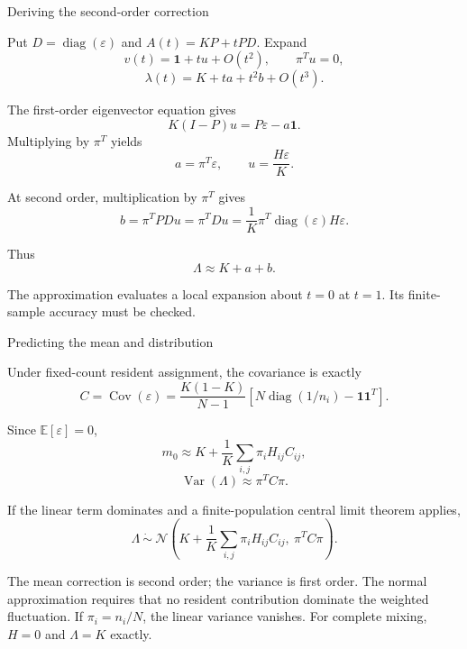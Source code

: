 \begin{frame}{Deriving the second-order correction}
\small

Put $D=\operatorname{diag}(\varepsilon)$ and
$A(t)=KP+tPD$. Expand
\[
    v(t)=\mathbf{1}+tu+O(t^2),
    \qquad
    \pi^Tu=0,
\]
\[
    \lambda(t)=K+ta+t^2b+O(t^3).
\]

The first-order eigenvector equation gives
\[
    K(I-P)u=P\varepsilon-a\mathbf{1}.
\]
Multiplying by $\pi^T$ yields
\[
    a=\pi^T\varepsilon,
    \qquad
    u=\frac{H\varepsilon}{K}.
\]

At second order, multiplication by $\pi^T$ gives
\[
    b=\pi^TPDu
     =\pi^TDu
     =\frac{1}{K}
       \pi^T\operatorname{diag}(\varepsilon)H\varepsilon.
\]

Thus
\[
    \Lambda\approx K+a+b.
\]

{\footnotesize
The approximation evaluates a local expansion about $t=0$
at $t=1$. Its finite-sample accuracy must be checked.
}
\end{frame}



\begin{frame}{Predicting the mean and distribution}
\small

Under fixed-count resident assignment, the covariance is exactly
\[
    C=\operatorname{Cov}(\varepsilon)
    =
    \frac{K(1-K)}{N-1}
    \left[
        N\operatorname{diag}(1/n_i)
        -\mathbf{1}\mathbf{1}^T
    \right].
\]

Since $\mathbb{E}[\varepsilon]=0$,
\[
    \boxed{
        m_0\approx
        K+\frac{1}{K}
        \sum_{i,j}\pi_iH_{ij}C_{ij}
    },
\]
\[
    \boxed{
        \operatorname{Var}(\Lambda)\approx\pi^TC\pi
    }.
\]

If the linear term dominates and a finite-population
central limit theorem applies,
\[
    \Lambda\ \dot\sim\
    \mathcal{N}\!\left(
        K+\frac{1}{K}\sum_{i,j}\pi_iH_{ij}C_{ij},
        \ \pi^TC\pi
    \right).
\]

{\footnotesize
The mean correction is second order; the variance is first order.
The normal approximation requires that no resident contribution
dominate the weighted fluctuation.
If $\pi_i=n_i/N$, the linear variance vanishes.
For complete mixing, $H=0$ and $\Lambda=K$ exactly.
}
\end{frame}


